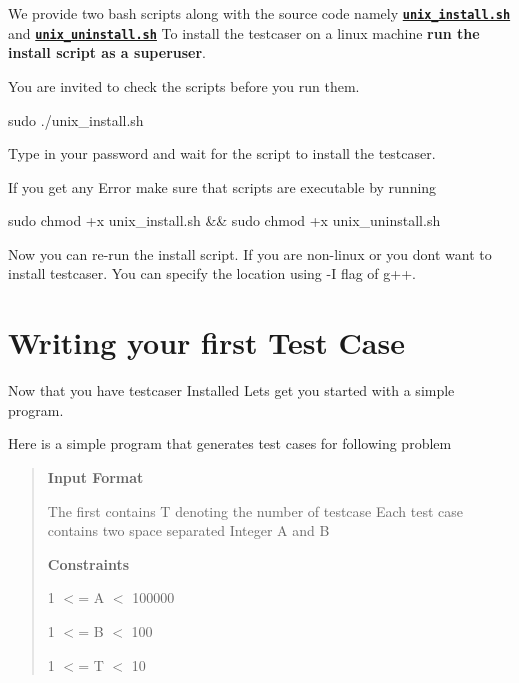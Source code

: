 We provide two bash scripts along with the source code namely \href{https://github.com/coder3101/testcaser/blob/master/unix_install.sh}{\tt {\bfseries unix\+\_\+install.\+sh}} and \href{https://github.com/coder3101/testcaser/blob/master/unix_uninstall.sh}{\tt {\bfseries unix\+\_\+uninstall.\+sh}} To install the testcaser on a linux machine {\bfseries run the install script as a superuser}.

You are invited to check the scripts before you run them.


\begin{DoxyCode}
sudo ./unix\_install.sh
\end{DoxyCode}


Type in your password and wait for the script to install the testcaser.

If you get any Error make sure that scripts are executable by running 
\begin{DoxyCode}
sudo chmod +x unix\_install.sh && sudo chmod +x unix\_uninstall.sh
\end{DoxyCode}


Now you can re-\/run the install script. If you are non-\/linux or you don\textquotesingle{}t want to install testcaser. You can specify the location using {\ttfamily -\/I} flag of {\ttfamily g++}.\hypertarget{index_started}{}\section{Writing your first Test Case}\label{index_started}
Now that you have testcaser Installed Let\textquotesingle{}s get you started with a simple program.

Here is a simple program that generates test cases for following problem \begin{quote}
{\bfseries Input Format}

The first contains T denoting the number of testcase Each test case contains two space separated Integer A and B

{\bfseries Constraints}

1 $<$= A $<$ 100000

1 $<$= B $<$ 100

1 $<$= T $<$ 10 \end{quote}



